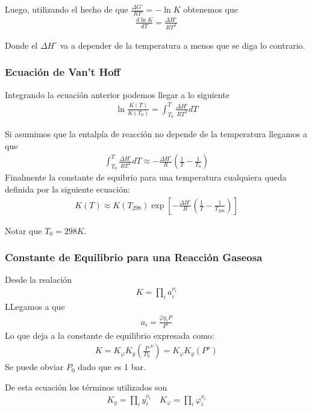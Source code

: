 Luego, utilizando el hecho de que $\frac{\Delta G^\circ}{RT}=-\ln K$ obtenemos que
\begin{align}
    \frac{d \ln K}{dT}=\frac{\Delta H^\circ}{RT^2}
\end{align}

Donde el $\Delta H^\circ$ va a depender de la temperatura a menos que se diga lo contrario.

\subsubsection{Ecuación de Van't Hoff}
Integrando la ecuación anterior podemos llegar a lo siguiente
\begin{align}
    \ln\frac{K(T)}{K(T_0)}=\int_{T_0}^{T}\frac{\Delta H^\circ}{RT^2}dT
\end{align}

Si asumimos que la entalpía de reacción no depende de la temperatura llegamos a que 
\begin{align}
    \int_{T_0}^{T}\frac{\Delta H^\circ}{RT^2}dT \approx -\frac{\Delta H^\circ }{R}\left(\frac{1}{T}-\frac{1}{T_0}\right)
\end{align}
Finalmente la constante de equibrio para una temperatura cualquiera queda definida por la siguiente ecuación:
\begin{align}
    K(T)\approx K(T_{298})\exp\left[ -\frac{\Delta H^\circ }{R}\left(\frac{1}{T}-\frac{1}{T_{298}}\right)  \right]
\end{align}

Notar que $T_0=298 K$.

\subsubsection{Constante de Equilibrio para  una Reacción Gaseosa}
Desde la realación
\begin{align}
    K=\prod_i a_i^{\nu_i}
\end{align}
LLegamos a que 
\begin{align}
    a_i=\frac{\hat{\varphi}y_i P}{P^\circ}
\end{align}
Lo que deja a la constante de equilibrio expresada como:
\begin{align}
    K=K_{\varphi}K_{y}\left(  \frac{P}{P_0}^{\nu}\right)=K_{\varphi}K_{y}\left(  P^{\nu}\right)
\end{align}
Se puede obviar $P_0$ dado que es 1 bar.

De esta ecuación los términos utilizados son
\begin{align}
    K_y=\prod_i y_i^{\nu_i}\quad K_\varphi =\prod_i \varphi_i^{\nu_i}
\end{align}

